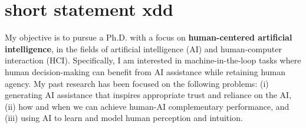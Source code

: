 
\section{short statement xdd}




My objective is to pursue a Ph.D. with a focus on \textbf{human-centered artificial intelligence}, in the fields of artificial intelligence (AI) and human-computer interaction (HCI). Specifically, I am interested in machine-in-the-loop tasks where human decision-making can benefit from AI assistance while retaining human agency. 
My past research has been focused on the following problems: (i) generating AI assistance that inspires appropriate trust and reliance on the AI, (ii) how and when we can achieve human-AI complementary performance, and (iii) using AI to learn and model human perception and intuition.